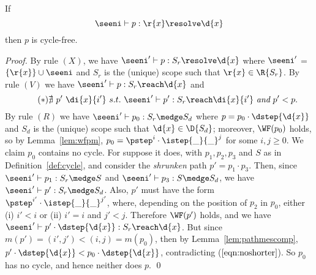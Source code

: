 \begin{lemma}
If 
\begin{equation*}
\seeni \vdash p : \r{x} \resolve \d{x}
\end{equation*}
then $p$ is cycle-free.
\end{lemma}
\begin{proof}
By rule $(X)$, we have $\seeni' \vdash p: S_r \resolve \d{x}$ where
$\seeni'$ = $\{\r{x}\} \cup \seeni$ and
$S_r$ is the (unique) scope such that $\r{x} \in \R{S_r}$.
By rule $(V)$ we have $\seeni' \vdash p: S_r \reach \d{x}$ and
\begin{equation}\label{eqn:noshorter}\tag{\mbox{$*$}}
\nexists\ p'\ \di{x}{i'}\ s.t.\ \seeni' \vdash p': S_r \reach \di{x}{i'}\ \mbox{\it and}\ p' < p.
\end{equation}
By rule $(R)$ we have 
$\seeni' \vdash p_0: S_r \medge S_d$ where $p = p_0 \cdot \dstep{\d{x}}$ and
$S_d$ is the (unique) scope such that $\d{x} \in \D{S_d}$;
moreover, $\WF(p_0)$ holds, so by Lemma~\ref{lem:wfpm}, 
$p_0=\pstep^i\cdot\istep{\_}{\_}^j$ for some $i,j \geq 0$.
We claim $p_0$ contains no cycle.
For suppose it does, with $p_1, p_2, p_3$ and $S$ as in Definition~\ref{def:cycle}, 
and consider the {\it shrunken} path $p' = p_1 \cdot p_3$. Then, since
$\seeni' \vdash p_1 : S_r \medge S$ and $\seeni' \vdash p_3 : S \medge S_d$, we have
$\seeni' \vdash p' : S_r \medge S_d$.  Also, $p'$ must have the form $\pstep^{i'}\cdot\istep{\_}{\_}^{j'}$,
where, depending on the position of $p_2$ in $p_0$,  
either (i) $i' < i$ or (ii) $i' = i$ and $j' < j$. Therefore $\WF(p')$ holds, 
and we have $\seeni' \vdash p' \cdot \dstep{\d{x}} : S_r \reach \d{x}$.
But since $m(p') = (i',j') < (i,j) = m(p_0)$, then by Lemma~\ref{lem:pathmescomp}, $p'\cdot\dstep{\d{x}} < p_0\cdot\dstep{\d{x}}$, contradicting ($\ref{eqn:noshorter}$). 
So $p_0$ has no cycle, and hence neither does $p$. \qed
\end{proof}

